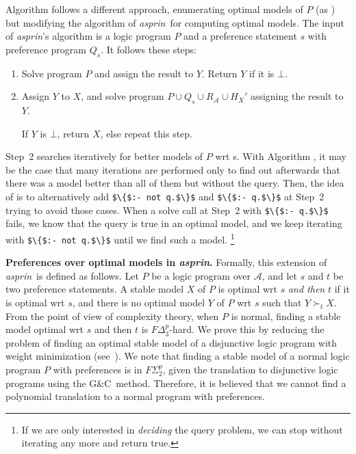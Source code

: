 \documentclass[a4paper,UKenglish]{oasics}
\newcommand{\lm}[1]{\lstinline[mathescape=true]!#1!}
\newcommand{\gc}[0]{G{\&}C}
\newcommand{\sysfont}{\textit}
\newcommand{\asprin}{\sysfont{asprin}}
\newcommand{\mysubsection}[2]{\smallskip\noindent\textbf{#1.}}
\newcommand{\Qlabel}[1]{\textcolor{darkgray}{\small\sffamily\bfseries\mathversion{bold}{Q-#1}}}
\begin{document}
Algorithm \Qlabel{4} follows a different approach, enumerating optimal models of $P$ (as \Qlabel{2}) 
but modifying the algorithm of \asprin\ for computing optimal models.
%
The input of \asprin's algorithm is a logic program $P$ and a preference statement $s$ with preference program $Q_s$.
%
It follows these steps:
\begin{enumerate}
\item
Solve program $P$ and assign the result to $Y$. Return $Y$ if it is $\bot$.
\item
Assign $Y$ to $X$, and solve program $P \cup Q_s \cup R_\mathcal{A} \cup H_{X}'$ assigning the result to $Y$.
\par
If $Y$ is $\bot$, return $X$, else repeat this step.
\end{enumerate}
%
Step~2 searches iteratively for better models of $P$ wrt s.
%
With Algorithm \Qlabel{3}, it may be the case that many iterations are performed 
only to find out afterwards that there was a model better than all of them but without the query.
%
Then, the idea of \Qlabel{4} is to alternatively add \lm{$\{$:- not q.$\}$} and \lm{$\{$:- q.$\}$} 
at Step~2 trying to avoid those cases.
%
When a solve call at Step~2 with \lm{$\{$:- q.$\}$} fails, 
we know that the query is true in an optimal model, 
and we keep iterating with  \lm{$\{$:- not q.$\}$} until we find such a model.%
\footnote{If we are only interested in \emph{deciding} the query problem, 
          we can stop without iterating any more and return true.}
%
%


%
%
%
%

%
\makeatletter{}%
%
\mysubsection{Preferences over optimal models in \asprin}{sec:preferences}
%
%
%
%
Formally, this extension of \asprin\ is defined as follows.
%
Let $P$ be a logic program over $\mathcal{A}$, 
and let $s$ and $t$ be two preference statements.
%
A stable model $X$ of $P$ is optimal wrt $s$ \emph{and then} $t$ if
it is optimal wrt $s$, 
and there is no optimal model $Y$ of $P$ wrt $s$ such that $Y \succ_t X$.
%
From the point of view of complexity theory, when $P$ is normal, 
finding a stable model optimal wrt $s$ and then $t$ is $F\Delta^p_3$-hard.
We prove this by reducing the problem of finding an optimal stable model of a 
disjunctive logic program with weight minimization (see~\cite{roscwa16a}). %
%
We note that finding a stable model of a normal logic program $P$ with preferences 
is in $F\Sigma^p_2$, given the translation to disjunctive logic programs using the \gc\ method.
%
Therefore, it is believed that we cannot find a polynomial translation to a normal program with preferences.
%
%
\end{document}
